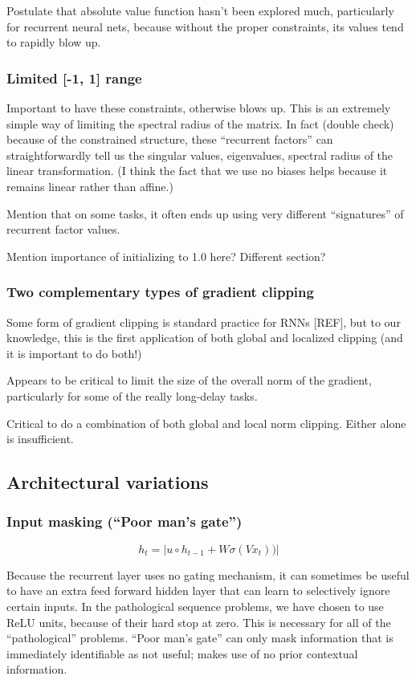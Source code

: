 \documentclass{article}
\begin{document}
Postulate that absolute value function hasn’t been explored much, particularly for recurrent neural nets, because without the proper constraints, its values tend to rapidly blow up.


\subsubsection{Limited [-1, 1] range}
Important to have these constraints, otherwise blows up.
This is an extremely simple way of limiting the spectral radius of the matrix.
In fact (double check) because of the constrained structure, these “recurrent factors” can straightforwardly tell us the singular values, eigenvalues, spectral radius of the linear transformation. (I think the fact that we use no biases helps because it remains linear rather than affine.)

Mention that on some tasks, it often ends up using very different “signatures” of recurrent factor values.

Mention importance of initializing to 1.0 here? Different section?
\subsubsection{Two complementary types of gradient clipping}

Some form of gradient clipping is standard practice for RNNs [REF], but to our knowledge, this is the first application of both global and localized clipping (and it is important to do both!)

Appears to be critical to limit the size of the overall norm of the gradient, particularly for some of the really long-delay tasks.

Critical to do a combination of both global and local norm clipping. Either alone is insufficient.
\subsection{Architectural variations}
\subsubsection{Input masking (“Poor man’s gate”)}

\[h_t = | u \circ h_{t-1} + W\sigma (Vx_t)) |\]

Because the recurrent layer uses no gating mechanism, it can sometimes be useful to have an extra feed forward hidden layer that can learn to selectively ignore certain inputs. In the pathological sequence problems, we have chosen to use ReLU units, because of their hard stop at zero.
This is necessary for all of the “pathological” problems.
“Poor man’s gate” can only mask information that is immediately identifiable as not useful; makes use of no prior contextual information.
\end{document}
